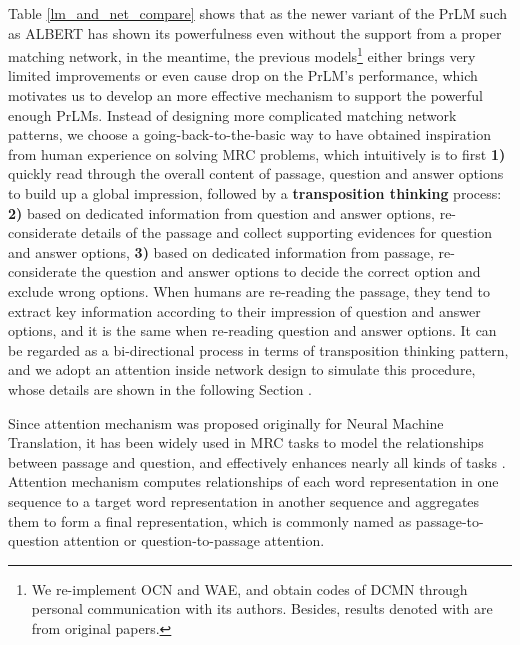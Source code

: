 \documentclass[letterpaper]{article} \usepackage{aaai21}  \usepackage{times}  \usepackage{helvet} \usepackage{courier}  \usepackage[hyphens]{url}  \usepackage{graphicx} \urlstyle{rm} \def\UrlFont{\rm}  \usepackage{natbib}  \usepackage{caption} \frenchspacing  \setlength{\pdfpagewidth}{8.5in}  \setlength{\pdfpageheight}{11in}
\begin{document}
Table \ref{lm_and_net_compare} shows that as the newer variant of the PrLM such as ALBERT \cite{albert} has shown its powerfulness even without the support from a proper matching network, in the meantime, the previous models\footnote{We re-implement OCN and WAE, and obtain codes of DCMN through personal communication with its authors. Besides, results denoted with  are from original papers.} \cite{ocn, bert_wae, dcmn} either brings very limited improvements or even cause drop on the PrLM's \cite{bert, xlnet, albert, clark2020electra} performance, which motivates us to develop an more effective mechanism to support the powerful enough PrLMs. Instead of designing more complicated matching network patterns, we choose a going-back-to-the-basic way to have obtained inspiration from human experience on solving MRC problems, which intuitively is to first \textbf{1)} quickly read through the overall content of passage, question and answer options to build up a global impression, followed by a \textbf{transposition thinking} process: \textbf{2)} based on dedicated information from question and answer options, re-considerate details of the passage and collect supporting evidences for question and answer options, \textbf{3)} based on dedicated information from passage, re-considerate the question and answer options to decide the correct option and exclude wrong options. When humans are re-reading the passage, they tend to extract key information according to their impression of question and answer options, and it is the same when re-reading question and answer options. It can be regarded as a bi-directional process in terms of transposition thinking pattern, and we adopt an attention inside network design to simulate this procedure, whose details are shown in the following Section \textit{}.

Since attention mechanism was proposed \cite{nmt_attention} originally for Neural Machine Translation, it has been widely used in MRC tasks to model the relationships between passage and question, and effectively enhances nearly all kinds of tasks \cite{bidaf,dua,dcmn}. Attention mechanism computes relationships of each word representation in one sequence to a target word representation in another sequence and aggregates them to form a final representation, which is commonly named as passage-to-question attention or question-to-passage attention.
\end{document}
